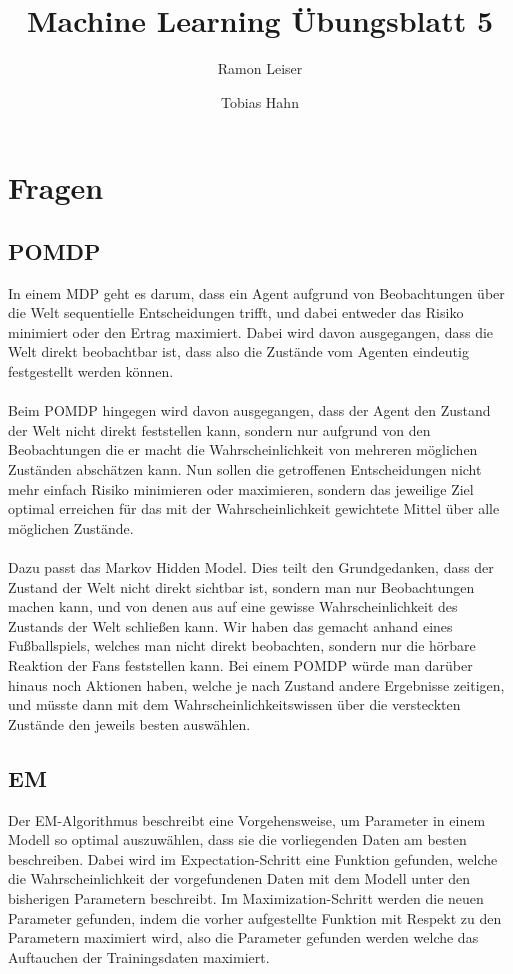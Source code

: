 \documentclass[a4paper]{article}
\title{Machine Learning Übungsblatt 5}
\author{Ramon Leiser\and Tobias Hahn}
\begin{document}
\maketitle
\newpage
\section*{Fragen}
\subsection{POMDP}
In einem MDP geht es darum, dass ein Agent aufgrund von Beobachtungen über die Welt sequentielle Entscheidungen trifft, und dabei entweder das Risiko minimiert oder den Ertrag maximiert. Dabei wird davon ausgegangen, dass die Welt direkt beobachtbar ist, dass also die Zustände vom Agenten eindeutig festgestellt werden können.
\paragraph{}
Beim POMDP hingegen wird davon ausgegangen, dass der Agent den Zustand der Welt nicht direkt feststellen kann, sondern nur aufgrund von den Beobachtungen die er macht die Wahrscheinlichkeit von mehreren möglichen Zuständen abschätzen kann. Nun sollen die getroffenen Entscheidungen nicht mehr einfach Risiko minimieren oder maximieren, sondern das jeweilige Ziel optimal erreichen für das mit der Wahrscheinlichkeit gewichtete Mittel über alle möglichen Zustände.
\paragraph{}
Dazu passt das Markov Hidden Model. Dies teilt den Grundgedanken, dass der Zustand der Welt nicht direkt sichtbar ist, sondern man nur Beobachtungen machen kann, und von denen aus auf eine gewisse Wahrscheinlichkeit des Zustands der Welt schließen kann. Wir haben das gemacht anhand eines Fußballspiels, welches man nicht direkt beobachten, sondern nur die hörbare Reaktion der Fans feststellen kann. Bei einem POMDP würde man darüber hinaus noch Aktionen haben, welche je nach Zustand andere Ergebnisse zeitigen, und müsste dann mit dem Wahrscheinlichkeitswissen über die versteckten Zustände den jeweils besten auswählen.

\subsection{EM}
Der EM-Algorithmus beschreibt eine Vorgehensweise, um Parameter in einem Modell so optimal auszuwählen, dass sie die vorliegenden Daten am besten beschreiben.
Dabei wird im Expectation-Schritt eine Funktion gefunden, welche die Wahrscheinlichkeit der vorgefundenen Daten mit dem Modell unter den bisherigen Parametern beschreibt. Im Maximization-Schritt werden die neuen Parameter gefunden, indem die vorher aufgestellte Funktion mit Respekt zu den Parametern maximiert wird, also die Parameter gefunden werden welche das Auftauchen der Trainingsdaten maximiert.
\end{document}
